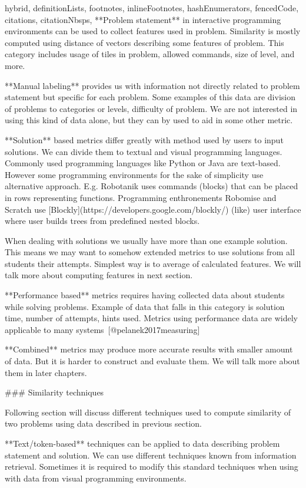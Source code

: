 \documentclass[
  digital, %
  table,   %
  lof,     %
  lot,     %
]{fithesis3}
\begin{document}
\begin{markdown*}{%
  hybrid,
  definitionLists,
  footnotes,
  inlineFootnotes,
  hashEnumerators,
  fencedCode,
  citations,
  citationNbsps,
}
**Problem statement** in interactive programming environments can be used to collect features used in problem. Similarity is mostly computed using distance of vectors describing some features of problem. This category includes usage of tiles in problem, allowed commands, size of level, and more.

**Manual labeling** provides us with information not directly related to problem statement but specific for each problem. Some examples of this data are division of problems to categories or levels, difficulty of problem. We are not interested in using this kind of data alone, but they can by used to aid in some other metric.

**Solution** based metrics differ greatly with method used by users to input solutions. We can divide them to textual and visual programming languages. Commonly used programming languages like Python or Java are text-based. However some programming environments for the sake of simplicity use alternative approach. E.g. Robotanik uses commands (blocks) that can be placed in rows representing functions. Programming enthronements Robomise and Scratch use [Blockly](https://developers.google.com/blockly/) (like) user interface where user builds trees from predefined nested blocks.

When dealing with solutions we usually have more than one example solution. This means we may want to somehow extended metrics to use solutions from all students their attempts. Simplest way is to average of calculated features. We will talk more about computing features in next section.

**Performance based** metrics requires having collected data about students while solving problems. Example of data that falls in this category is solution time, number of attempts, hints used. Metrics using performance data are widely applicable to many systems~[@pelanek2017measuring]

**Combined** metrics may produce more accurate results with smaller amount of data. But it is harder to construct and evaluate them. We will talk more about them in later chapters.

### Similarity techniques

Following section will discuss different techniques used to compute similarity of two problems using data described in previous section.

**Text/token-based** techniques can be applied to data describing problem statement and solution. We can use different techniques known from information retrieval. Sometimes it is required to modify this standard techniques when using with data from visual programming environments.


\end{markdown*}
\end{document}
